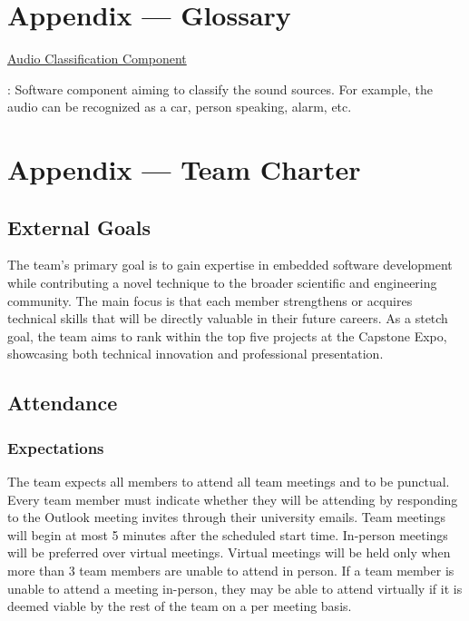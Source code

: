 \documentclass{article}
\begin{document}
\newpage{}

\section*{Appendix --- Glossary}


\hypertarget{audio_classification_component}{\underline{Audio Classification
Component}}: Software component aiming to classify the sound sources. For
example, the audio can be recognized as a car, person speaking, alarm, etc.

\newpage{}

\section*{Appendix --- Team Charter}

\subsection*{External Goals}

The team's primary goal is to gain expertise in embedded software development
while contributing a novel technique to the broader scientific and engineering
community. The main focus is that each member strengthens or acquires technical
skills that will be directly valuable in their future careers. As a stetch goal,
the team aims to rank within the top five projects at the Capstone Expo,
showcasing both technical innovation and professional presentation.

\subsection*{Attendance}

\subsubsection*{Expectations}

The team expects all members to attend all team meetings and to be punctual.
Every team member must indicate whether they will be attending by responding to
the Outlook meeting invites through their university emails. Team meetings will
begin at most 5 minutes after the scheduled start time. In-person meetings will
be preferred over virtual meetings. Virtual meetings will be held only when more
than 3 team members are unable to attend in person. If a team member is unable
to attend a meeting in-person, they may be able to attend virtually if it is
deemed viable by the rest of the team on a per meeting basis.
\end{document}
